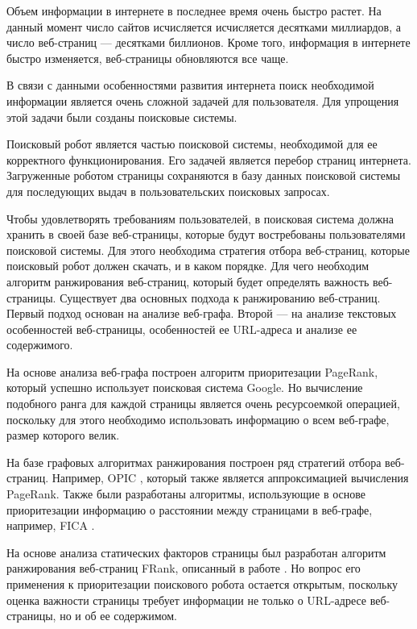 \startprefacepage

Объем информации в интернете в последнее время очень быстро растет. На данный момент число сайтов исчисляется исчисляется десятками миллиардов, а число веб-страниц --- десятками биллионов. Кроме того, информация в интернете быстро изменяется, веб-страницы обновляются все чаще. 

В связи с данными особенностями развития интернета поиск необходимой информации является очень сложной задачей для пользователя. Для упрощения этой задачи были созданы поисковые системы. 

Поисковый робот является частью поисковой системы, необходимой для ее корректного функционирования. Его задачей является перебор страниц интернета. Загруженные роботом страницы сохраняются в базу данных поисковой системы для последующих выдач в пользовательских поисковых запросах.

Чтобы удовлетворять требованиям пользователей, в поисковая система должна хранить в своей базе веб-страницы, которые будут востребованы пользователями поисковой системы. Для этого необходима стратегия отбора веб-страниц, которые поисковый робот должен скачать, и в каком порядке. Для чего необходим алгоритм ранжирования веб-страниц, который будет определять важность веб-страницы. Существует два основных подхода к ранжированию веб-страниц. Первый подход основан на анализе веб-графа. Второй --- на анализе текстовых особенностей веб-страницы, особенностей ее URL-адреса и анализе ее содержимого. 

На основе анализа веб-графа построен алгоритм приоритезации PageRank, который успешно использует поисковая система Google. Но вычисление подобного ранга для каждой страницы является очень ресурсоемкой операцией, поскольку для этого необходимо использовать информацию о всем веб-графе, размер которого велик. 

На базе графовых алгоритмах ранжирования построен ряд стратегий отбора веб-страниц. Например, OPIC \cite{OPIC}, который также является аппроксимацией вычисления PageRank. Также были разработаны алгоритмы, использующие в основе приоритезации информацию о расстоянии между страницами в веб-графе, например, FICA \cite{FICA}. 

На основе анализа статических факторов страницы был разработан алгоритм ранжирования веб-страниц FRank, описанный в работе \cite{FRank}. Но вопрос его применения к приоритезации поискового робота остается открытым, поскольку оценка важности страницы требует информации не только о URL-адресе веб-страницы, но и об ее содержимом.

